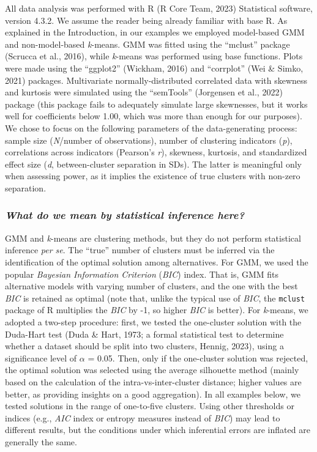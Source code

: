 \documentclass[
  man,floatsintext]{apa7}
\begin{document}
All data analysis was performed with R (R Core Team, 2023) Statistical software, version 4.3.2. We assume the reader being already familiar with base R. As explained in the Introduction, in our examples we employed model-based GMM and non-model-based \emph{k}-means. GMM was fitted using the ``mclust'' package (Scrucca et al., 2016), while \emph{k}-means was performed using base functions. Plots were made using the ``ggplot2'' (Wickham, 2016) and ``corrplot'' (Wei \& Simko, 2021) packages. Multivariate normally-distributed correlated data with skewness and kurtosis were simulated using the ``semTools'' (Jorgensen et al., 2022) package (this package fails to adequately simulate large skewnesses, but it works well for coefficients below 1.00, which was more than enough for our purposes). We chose to focus on the following parameters of the data-generating process: sample size (\emph{N}/number of observations), number of clustering indicators (\emph{p}), correlations across indicators (Pearson's \emph{r}), skewness, kurtosis, and standardized effect size (\emph{d}, between-cluster separation in SDs). The latter is meaningful only when assessing power, as it implies the existence of true clusters with non-zero separation.

\hypertarget{what-do-we-mean-by-statistical-inference-here}{%
\subsubsection{\texorpdfstring{\emph{What do we mean by statistical inference here?}}{What do we mean by statistical inference here?}}\label{what-do-we-mean-by-statistical-inference-here}}

GMM and \emph{k}-means are clustering methods, but they do not perform statistical inference \emph{per se}. The ``true'' number of clusters must be inferred via the identification of the optimal solution among alternatives. For GMM, we used the popular \emph{Bayesian Information Criterion} (\emph{BIC}) index. That is, GMM fits alternative models with varying number of clusters, and the one with the best \emph{BIC} is retained as optimal (note that, unlike the typical use of \emph{BIC}, the \texttt{mclust} package of R multiplies the \emph{BIC} by -1, so higher \emph{BIC} is better). For \emph{k}-means, we adopted a two-step procedure: first, we tested the one-cluster solution with the Duda-Hart test (Duda \& Hart, 1973; a formal statistical test to determine whether a dataset should be split into two clusters, Hennig, 2023), using a significance level of \emph{\(\alpha\)} = 0.05. Then, only if the one-cluster solution was rejected, the optimal solution was selected using the average silhouette method (mainly based on the calculation of the intra-vs-inter-cluster distance; higher values are better, as providing insights on a good aggregation). In all examples below, we tested solutions in the range of one-to-five clusters. Using other thresholds or indices (e.g., \emph{AIC} index or entropy measures instead of \emph{BIC}) may lead to different results, but the conditions under which inferential errors are inflated are generally the same.
\end{document}
